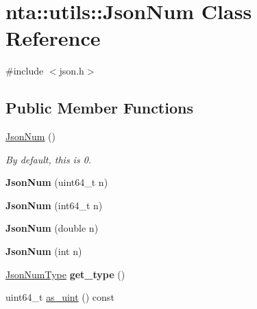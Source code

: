 \hypertarget{classnta_1_1utils_1_1JsonNum}{}\section{nta\+:\+:utils\+:\+:Json\+Num Class Reference}
\label{classnta_1_1utils_1_1JsonNum}


{\ttfamily \#include $<$json.\+h$>$}

\subsection*{Public Member Functions}
\begin{DoxyCompactItemize}
\item 
\mbox{\label{classnta_1_1utils_1_1JsonNum_a4c16668854577689d9ae6e6a9f7fd62d}} 
\hyperlink{classnta_1_1utils_1_1JsonNum_a4c16668854577689d9ae6e6a9f7fd62d}{Json\+Num} ()
\begin{DoxyCompactList}\small\item\em By default, this is 0. \end{DoxyCompactList}\item 
\mbox{\label{classnta_1_1utils_1_1JsonNum_a2a17dbe70a84cd8d202b6ad5b865ec28}} 
{\bfseries Json\+Num} (uint64\+\_\+t n)
\item 
\mbox{\label{classnta_1_1utils_1_1JsonNum_a30dcf42823f7d99800c2eac63fdd8026}} 
{\bfseries Json\+Num} (int64\+\_\+t n)
\item 
\mbox{\label{classnta_1_1utils_1_1JsonNum_a94ecf5200ab6caa555850d96441dae29}} 
{\bfseries Json\+Num} (double n)
\item 
\mbox{\label{classnta_1_1utils_1_1JsonNum_ae4cd0552c7196301f7adf62394ad7e0c}} 
{\bfseries Json\+Num} (int n)
\item 
\mbox{\label{classnta_1_1utils_1_1JsonNum_a9df08dcba9a39706221cd215a295f16c}} 
\hyperlink{namespacenta_1_1utils_a83ee7c4cfccd9fa43564f5fe1c0c77d3}{Json\+Num\+Type} {\bfseries get\+\_\+type} ()
\item 
uint64\+\_\+t \hyperlink{classnta_1_1utils_1_1JsonNum_a89e8033a247c3342d99a762f6110d877}{as\+\_\+uint} () const

\end{DoxyCompactItemize}
